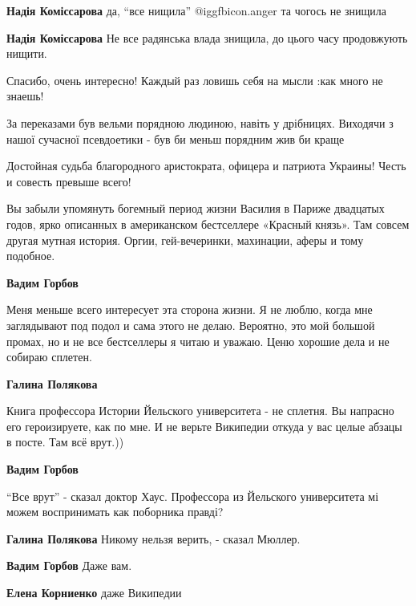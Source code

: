 \begin{itemize}
\begin{itemize}
\textbf{Надія Коміссарова} да, \enquote{все нищила}  @igg{fbicon.anger}  та чогось не знищила

\textbf{Надія Коміссарова} Не все радянська влада знищила, до цього часу продовжують нищити.
\end{itemize} %

Спасибо, очень интересно! Каждый раз ловишь себя на мысли :как много не знаешь!


За переказами був вельми порядною людиною, навіть у дрібницях. Виходячи з нашої
сучасної псевдоетики - був би меньш порядним жив би краще

Достойная судьба благородного аристократа, офицера и патриота Украины! Честь и совесть превыше всего!


Вы забыли упомянуть богемный период жизни Василия в Париже двадцатых годов,
ярко описанных в американском бестселлере «Красный князь». Там совсем другая
мутная история. Оргии, гей-вечеринки, махинации, аферы и тому подобное.

\begin{itemize} %
\textbf{Вадим Горбов} 

Меня меньше всего интересует эта сторона жизни. Я не люблю, когда мне
заглядывают под подол и сама этого не делаю. Вероятно, это мой большой промах,
но и не все бестселлеры я читаю и уважаю. Ценю хорошие дела и не собираю
сплетен.

\begin{itemize} %
\textbf{Галина Полякова} 

Книга профессора Истории Йельского университета - не сплетня. Вы напрасно его
героизируете, как по мне. И не верьте Википедии откуда у вас целые абзацы в
посте. Там всё врут.))


\textbf{Вадим Горбов} 

\enquote{Все врут} - сказал доктор Хаус. Профессора из Йельского университета мі можем
воспринимать как поборника правді?

\textbf{Галина Полякова} Никому нельзя верить, - сказал Мюллер.

\textbf{Вадим Горбов} Даже вам.

\textbf{Елена Корниенко} даже Википедии


\end{itemize}
\end{itemize}
\end{itemize}
